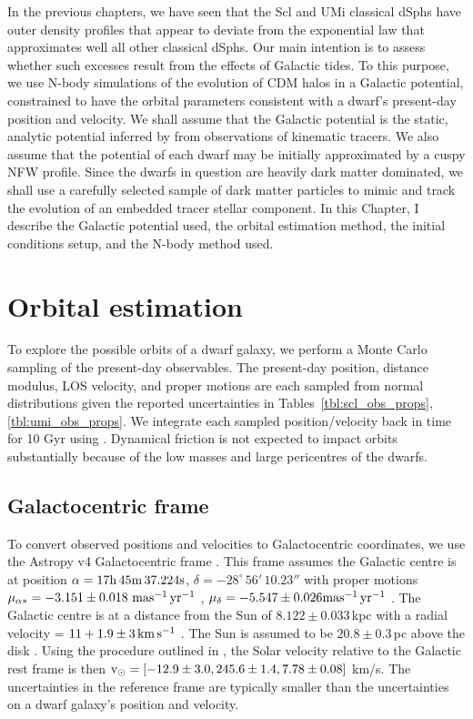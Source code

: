 In the previous chapters, we have seen that the Scl and UMi classical
dSphs have outer density profiles that appear to deviate from the
exponential law that approximates well all other classical dSphs. Our
main intention is to assess whether such excesses result from the
effects of Galactic tides. To this purpose, we use N-body simulations of
the evolution of CDM halos in a Galactic potential, constrained to have
the orbital parameters consistent with a dwarf's present-day position
and velocity. We shall assume that the Galactic potential is the static,
analytic potential inferred by \citet{mcmillan2011} from observations of
kinematic tracers. We also assume that the potential of each dwarf may
be initially approximated by a cuspy NFW profile. Since the dwarfs in
question are heavily dark matter dominated, we shall use a carefully
selected sample of dark matter particles to mimic and track the
evolution of an embedded tracer stellar component. In this Chapter, I
describe the Galactic potential used, the orbital estimation method, the
initial conditions setup, and the N-body method used.

\section{Orbital estimation}\label{orbital-estimation}

To explore the possible orbits of a dwarf galaxy, we perform a Monte
Carlo sampling of the present-day observables. The present-day position,
distance modulus, LOS velocity, and proper motions are each sampled from
normal distributions given the reported uncertainties in
Tables~\ref{tbl:scl_obs_props}, \ref{tbl:umi_obs_props}. We integrate
each sampled position/velocity back in time for 10 Gyr using \agama{}
\citep{agama}. Dynamical friction is not expected to impact orbits
substantially because of the low masses and large pericentres of the
dwarfs.

\subsection{Galactocentric frame}\label{galactocentric-frame}

To convert observed positions and velocities to Galactocentric
coordinates, we use the Astropy v4 Galactocentric frame
\citep{astropycollaboration+2022}. This frame assumes the Galactic
centre is at position \(\alpha = {\rm 17h\,45m\,37.224s}\),
\(\delta = -28^\circ\,56'\,10.23''\) with proper motions
\(\mu_{\alpha*}=-3.151\pm0.018\ {\rm mas^{-1}\,yr^{-1}}\) ,
\(\mu_\delta=-5.547\pm0.026 {\rm mas^{-1}\,yr^{-1}}\) \citep[from the appendix and Table
2 of][]{reid+brunthaler2004}. The Galactic centre is at a distance from
the Sun of \(8.122\pm0.033\,\)kpc with a radial velocity =
\(11 + 1.9 \pm 3\,{\rm km\,s^{-1}}\) \citep{gravitycollaboration+2018}. The Sun is
assumed to be \(20.8\pm0.3\,\)pc above the disk
\citep{bennett+bovy2019}. Using the procedure outlined in
\citet{drimmel+poggio2018}, the Solar velocity relative to the Galactic
rest frame is then
\({\rm v}_\odot = [-12.9 \pm 3.0, 245.6 \pm 1.4, 7.78 \pm 0.08]\) km/s. The
uncertainties in the reference frame are typically smaller than the
uncertainties on a dwarf galaxy's position and velocity.

